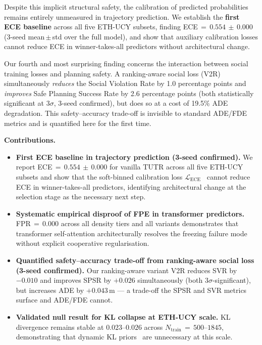 \documentclass{article}
\begin{document}
Despite this implicit structural safety, the calibration of predicted
probabilities remains entirely unmeasured in trajectory prediction. We
establish the \textbf{first ECE baseline} across all five ETH-UCY subsets,
finding ECE\,\(=\,0.554\,\pm\,0.000\) (3-seed mean\,\(\pm\)\,std over the
full model), and show that auxiliary calibration losses cannot reduce ECE in
winner-takes-all predictors without architectural change.

Our fourth and most surprising finding concerns the interaction between
social training losses and planning safety. A ranking-aware social loss
(V2R) simultaneously \emph{reduces} the Social Violation Rate by 1.0
percentage points and \emph{improves} Safe Planning Success Rate by 2.6
percentage points (both statistically significant at $3\sigma$, 3-seed
confirmed), but does so at a cost of 19.5\% ADE degradation. This
safety--accuracy trade-off is invisible to standard ADE/FDE metrics and
is quantified here for the first time.

\noindent\textbf{Contributions.}

\begin{itemize}

    \item \textbf{First ECE baseline in trajectory prediction (3-seed
    confirmed).} We report ECE\,\(=\,0.554\,\pm\,0.000\) for vanilla TUTR
    across all five ETH-UCY subsets and show that the soft-binned
    calibration loss \(\mathcal{L}_{\text{ECE}}\)~\cite{karandikar2021soft}
    cannot reduce ECE in winner-takes-all predictors, identifying
    architectural change at the selection stage as the necessary next step.

    \item \textbf{Systematic empirical disproof of FPE in transformer
    predictors.} FPR\,\(=\,0.000\) across all density tiers and all variants
    demonstrates that transformer self-attention architecturally resolves the
    freezing failure mode~\cite{trautman2010unfreezing} without explicit
    cooperative regularisation.

    \item \textbf{Quantified safety--accuracy trade-off from ranking-aware
    social loss (3-seed confirmed).} Our ranking-aware variant V2R reduces
    SVR by \(-0.010\) and improves SPSR by \(+0.026\) simultaneously
    (both $3\sigma$-significant), but increases ADE by \(+0.043\,\)m
    --- a trade-off the SPSR and SVR metrics surface and ADE/FDE
    cannot.

    \item \textbf{Validated null result for KL collapse at ETH-UCY scale.}
    KL divergence remains stable at \(0.023\)--\(0.026\) across
    \(N_{\text{train}}\,=\,500\)--\(1845\), demonstrating that dynamic KL
    priors~\cite{zhang2025openworld} are unnecessary at this scale.

\end{itemize}
\end{document}

